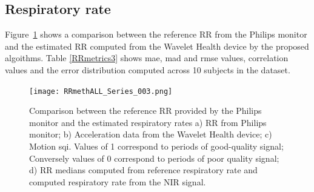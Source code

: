 \subsection{Respiratory rate}

Figure~\ref{RRseries} shows a comparison between the reference RR from the Philips monitor and the estimated RR computed from the Wavelet Health device by the proposed algoithms. Table \ref{RRmetrics3} shows \gls{mae}, \gls{mad} and \gls{rmse} values, correlation values and the error distribution computed across 10 subjects in the dataset. 
 

\begin{figure}
	\centering
	\texttt{[image: RRmethALL\_Series\_003.png]}
	 \caption[Comparison between the reference respiratory rate provided by the Philips monitor and the estimated respiratory rates.]{Comparison between the reference RR provided by the Philips monitor and the estimated respiratory rates a) RR from Philips monitor; b) Acceleration data from the Wavelet Health device; c) Motion \gls{sqi}. Values of 1 correspond to periods of good-quality signal; Conversely values of 0 correspond to periods of poor quality signal; d) RR medians computed from reference respiratory rate and computed respiratory rate from the NIR signal.}
	 \label{RRseries}
\end{figure}
    
    
    
